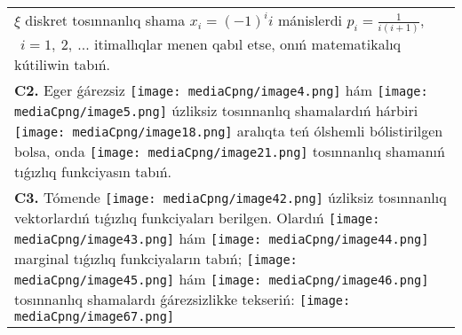 \documentclass{article}
\begin{document}
\begin{tabular}{m{17cm}}
\(\xi\) diskret tosınnanlıq shama \(x_{i} = ( - 1)^{i}i\) mánislerdi \(p_{i} = \frac{1}{i(i + 1)},\) \(\ \ i = 1,\ 2,\ ...\) itimallıqlar menen qabıl etse, onıń matematikalıq kútiliwin tabıń.
 \\
\textbf{C2.} Eger ǵárezsiz \texttt{[image: mediaCpng/image4.png]} hám \texttt{[image: mediaCpng/image5.png]} úzliksiz tosınnanlıq shamalardıń hárbiri \texttt{[image: mediaCpng/image18.png]} aralıqta teń ólshemli bólistirilgen bolsa, onda \texttt{[image: mediaCpng/image21.png]} tosınnanlıq shamanıń tıǵızlıq funkciyasın tabıń.
 \\
\textbf{C3.} Tómende \texttt{[image: mediaCpng/image42.png]} úzliksiz tosınnanlıq vektorlardıń tıǵızlıq funkciyaları berilgen. Olardıń \texttt{[image: mediaCpng/image43.png]} hám \texttt{[image: mediaCpng/image44.png]} marginal tıǵızlıq funkciyaların tabıń; \texttt{[image: mediaCpng/image45.png]} hám \texttt{[image: mediaCpng/image46.png]} tosınnanlıq shamalardı ǵárezsizlikke tekseriń: \texttt{[image: mediaCpng/image67.png]}
 \\

\end{tabular}
\vspace{1cm}
\end{document}
